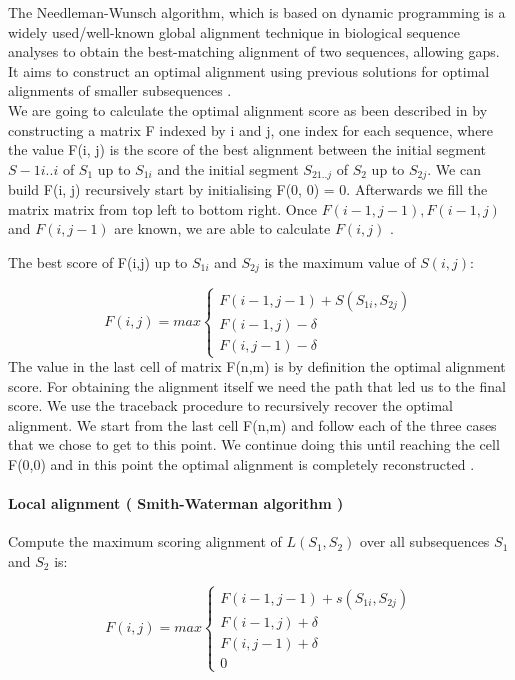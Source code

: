 \documentclass[11pt,a4paper]{report}
\begin{document}
The Needleman-Wunsch algorithm, which is based on dynamic programming is a widely used/well-known global alignment technique in biological sequence analyses to obtain the best-matching alignment of two sequences, allowing  gaps.\\
It aims to construct an optimal alignment using previous solutions for
optimal alignments of smaller subsequences \cite{durbin}.\\
We are going to calculate the optimal alignment score as been described in\cite{durbin} by constructing a matrix F indexed
by i and j, one index for each sequence, where the value F(i, j) is the score
of the best alignment between the initial segment $S-{1i..i}$ of $S_{1}$ up to $S_{1i}$ and the initial segment $S_{21..j}$ of $S_{2}$  up to $S_{2j}$. We can build F(i, j) recursively start by initialising F(0, 0) = 0. Afterwards we fill the matrix matrix from top left to bottom right. 
Once $ F(i-1, j-1 ), F(i-1 , j) $ and $ F(i , j-1) $ are known, we are able to calculate $ F(i, j)$ \cite{durbin}.

The best score of F(i,j) up to $S_{1i}$ and $S_{2j}$ is the maximum value of $S(i,j)$:

\[ F(i,j)= max
\begin{cases}
   F(i-1,j-1) + S(S_{1i} , S_{2j})\\
   F(i-1 , j)- \delta\\
   F(i,j-1)- \delta
\end{cases}
\]
The value in the last cell of matrix F(n,m) is by definition the optimal alignment score. 
For obtaining the alignment itself we need the path that led us to the final score. We use the traceback procedure to recursively recover the optimal alignment\cite{durbin}\cite{eddydynamic}.
We start from the last cell F(n,m) and follow each of the three cases that we chose to get to this point. We continue doing this until reaching the cell F(0,0) and in this point the optimal alignment is completely reconstructed \cite{eddydynamic}.



\paragraph{ Local alignment ( Smith-Waterman algorithm ) }

Compute the maximum scoring alignment of $L(S_{1}, S_{2})$ over all subsequences $S_{1}$ and $S_{2}$ is:


\[ F(i,j)= max
\begin{cases}
   F(i-1,j-1) + s(S_{1i} , S_{2j})\\
   F(i-1 , j)+ \delta\\
   F(i,j-1)+ \delta\\
   0 \quad  
\end{cases}
\]
\end{document}
